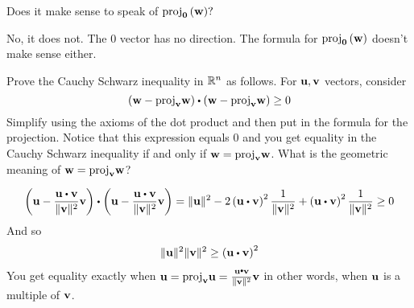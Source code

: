 \begin{enumialphparenastyle}
\begin{ex} Does it make sense to speak of $\mbox{proj}_{{\bf 0}}\left({\bf w}\right) ?$
\begin{sol}
No, it does not. The $0$ vector has no direction. The formula for $\mbox{proj}_{{\bf 0}}\left({\bf w}\right)$ doesn't make sense either.
\end{sol}
\end{ex}

\begin{ex} Prove the Cauchy Schwarz inequality in $\mathbb{R}^{n}$ as follows.
For ${\bf u},{\bf v}$ vectors, consider 
\begin{equation*}
\tup{\vect{w}-
\func{proj}_{\vect{v}}\vect{w}} \dotprod \tup{\vect{w}-
\func{proj}_{\vect{v}}\vect{w}} \geq 0
\end{equation*}
Simplify using the axioms of the dot product and then put in the formula
for the projection. Notice that this expression equals $0$ and you get equality
in the Cauchy Schwarz inequality if and only if 
${\bf w}=\mbox{proj}_{{\bf v}}{\bf w}$. What is the geometric meaning of 
${\bf w}=\mbox{proj}_{{\bf v}}{\bf w}$?
\begin{sol}
\[
\tup{\vect{u}-\frac{\vect{u}\dotprod \vect{v}}{\vectlength \vect{v}\vectlength
^{2}}\vect{v}} \dotprod \tup{\vect{u}-\frac{\vect{u}\dotprod \vect{v}}{\vectlength \vect{v}\vectlength ^{2}}\vect{v}} =\vectlength \vect{u
}\vectlength ^{2}-2\tup{\vect{u}\dotprod \vect{v}} ^{2}\frac{1}{\vectlength
\vect{v}\vectlength ^{2}}+\tup{\vect{u}\dotprod \vect{v}} ^{2}\frac{1}{
\vectlength \vect{v}\vectlength ^{2}}\geq 0
\]
And so
\[
\vectlength \vect{u}\vectlength ^{2}\vectlength \vect{v}\vectlength
^{2}\geq \tup{\vect{u}\dotprod \vect{v}} ^{2}
\]
You get equality exactly when $\vect{u}=\func{proj}_{\vect{v}}\vect{u}
= \frac{\vect{u}\dotprod \vect{v}}{\vectlength \vect{v}\vectlength ^{2}}\vect{v}$
in other words, when ${\bf u}$ is a multiple of ${\bf v}$.
\end{sol}
\end{ex}



\end{enumialphparenastyle}
